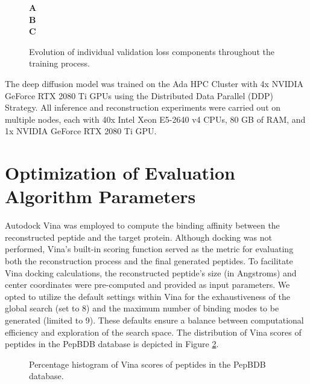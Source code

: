 \begin{figure}
  \center

  \textbf{\Large A}
   \\

  \textbf{\Large B}
   \\

  \textbf{\Large C}

  \caption{Evolution of individual validation loss components throughout the training process.}

  \label{fig:val_metrics}
\end{figure}

The deep diffusion model was trained on the Ada HPC Cluster with 4x NVIDIA GeForce RTX 2080 Ti GPUs using the Distributed Data Parallel (DDP) Strategy. All inference and reconstruction experiments were carried out on multiple nodes, each with 40x Intel Xeon E5-2640 v4 CPUs, 80 GB of RAM, and 1x NVIDIA GeForce RTX 2080 Ti GPU.

\section{Optimization of Evaluation Algorithm Parameters}
Autodock Vina was employed to compute the binding affinity between the reconstructed peptide and the target protein. Although docking was not performed, Vina's built-in scoring function served as the metric for evaluating both the reconstruction process and the final generated peptides. To facilitate Vina docking calculations, the reconstructed peptide's size (in Angstroms) and center coordinates were pre-computed and provided as input parameters. We opted to utilize the default settings within Vina for the exhaustiveness of the global search (set to 8) and the maximum number of binding modes to be generated (limited to 9). These defaults ensure a balance between computational efficiency and exploration of the search space. The distribution of Vina scores of peptides in the PepBDB database is depicted in Figure \ref{fig:vina_pepbdb}. \\

\begin{figure}
  \center


  \caption{Percentage histogram of Vina scores of peptides in the PepBDB database.}

  \label{fig:vina_pepbdb}
\end{figure}

